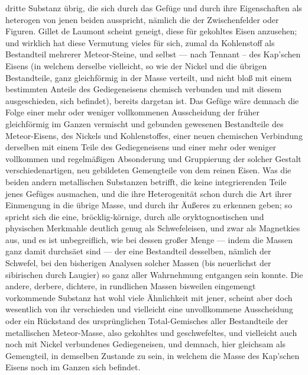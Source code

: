 \documentclass[a4paper, 11pt, oneside, german]{article}
\begin{document}
dritte Substanz übrig, die sich durch das Gefüge und durch ihre Eigenschaften als heterogen von jenen beiden ausspricht, nämlich die der Zwischenfelder oder Figuren. Gillet de Laumont scheint geneigt, diese für gekohltes Eisen anzusehen; und wirklich hat diese Vermutung vieles für sich, zumal da Kohlenstoff als Bestandteil mehrerer Meteor-Steine, und selbst --- nach Tennant -- des Kap’schen Eisens (in welchem derselbe vielleicht, so wie der Nickel und die übrigen Bestandteile, ganz gleichförmig in der Masse verteilt, und nicht bloß mit einem bestimmten Anteile des Gediegeneisens chemisch verbunden und mit diesem ausgeschieden, sich befindet), bereits dargetan ist.  
Das Gefüge wäre demnach die Folge einer mehr oder weniger vollkommenen Ausscheidung der früher gleichförmig im Ganzen vermischt und gebunden gewesenen Bestandteile des Meteor-Eisens, des Nickels und Kohlenstoffes, einer neuen chemischen Verbindung derselben mit einem Teile des Gediegeneisens und einer mehr oder weniger vollkommen und regelmäßigen Absonderung und Gruppierung der solcher Gestalt verschiedenartigen, neu gebildeten Gemengteile von dem reinen Eisen.  
Was die beiden andern metallischen Substanzen betrifft, die keine integrierenden Teile jenes Gefüges ausmachen, und die ihre Heterogenität schon durch die Art ihrer Einmengung in die übrige Masse, und durch ihr Äußeres zu erkennen geben; so spricht sich die eine, bröcklig-körnige, durch alle oryktognostischen und physischen Merkmahle deutlich genug als Schwefeleisen, und zwar als Magnetkies aus, und es ist unbegreiflich, wie bei dessen großer Menge --- indem die Massen ganz damit durchsäet sind --- der eine Bestandteil desselben, nämlich der Schwefel, bei den bisherigen Analysen solcher Massen (bis neuerlichst der sibirischen durch Laugier) so ganz aller Wahrnehmung entgangen sein konnte.  
Die andere, derbere, dichtere, in rundlichen Massen bisweilen eingemengt vorkommende Substanz hat wohl viele Ähnlichkeit mit jener, scheint aber doch wesentlich von ihr verschieden und vielleicht eine unvollkommene Ausscheidung oder ein Rückstand des ursprünglichen Total-Gemisches aller Bestandteile der metallischen Meteor-Masse, also gekohltes und geschwefeltes, und vielleicht auch noch mit Nickel verbundenes Gediegeneisen, und demnach, hier gleichsam als Gemengteil, in demselben Zustande zu sein, in welchem die Masse des Kap’schen Eisens noch im Ganzen sich befindet.  
\end{document}
